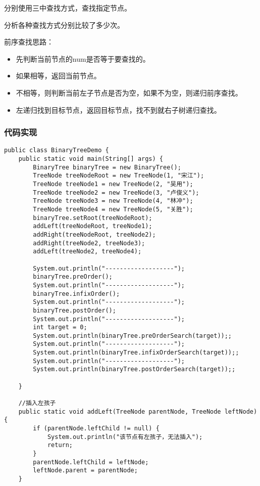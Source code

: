 \documentclass[a4paper]{report}
\begin{document}
分别使用三中查找方式，查找指定节点。

分析各种查找方式分别比较了多少次。

前序查找思路：
\begin{itemize}
  \item 先判断当前节点的num是否等于要查找的。
  \item 如果相等，返回当前节点。
  \item 不相等，则判断当前左子节点是否为空，如果不为空，则递归前序查找。
  \item 左递归找到目标节点，返回目标节点，找不到就右子树递归查找。
\end{itemize}
\subsubsection{代码实现}
\begin{lstlisting}
public class BinaryTreeDemo {
    public static void main(String[] args) {
        BinaryTree binaryTree = new BinaryTree();
        TreeNode treeNodeRoot = new TreeNode(1, "宋江");
        TreeNode treeNode1 = new TreeNode(2, "吴用");
        TreeNode treeNode2 = new TreeNode(3, "卢俊义");
        TreeNode treeNode3 = new TreeNode(4, "林冲");
        TreeNode treeNode4 = new TreeNode(5, "关胜");
        binaryTree.setRoot(treeNodeRoot);
        addLeft(treeNodeRoot, treeNode1);
        addRight(treeNodeRoot, treeNode2);
        addRight(treeNode2, treeNode3);
        addLeft(treeNode2, treeNode4);

        System.out.println("-------------------");
        binaryTree.preOrder();
        System.out.println("-------------------");
        binaryTree.infixOrder();
        System.out.println("-------------------");
        binaryTree.postOrder();
        System.out.println("-------------------");
        int target = 0;
        System.out.println(binaryTree.preOrderSearch(target));;
        System.out.println("-------------------");
        System.out.println(binaryTree.infixOrderSearch(target));;
        System.out.println("-------------------");
        System.out.println(binaryTree.postOrderSearch(target));;

    }

    //插入左孩子
    public static void addLeft(TreeNode parentNode, TreeNode leftNode) {
        if (parentNode.leftChild != null) {
            System.out.println("该节点有左孩子，无法插入");
            return;
        }
        parentNode.leftChild = leftNode;
        leftNode.parent = parentNode;
    }


\end{lstlisting}
\end{document}
